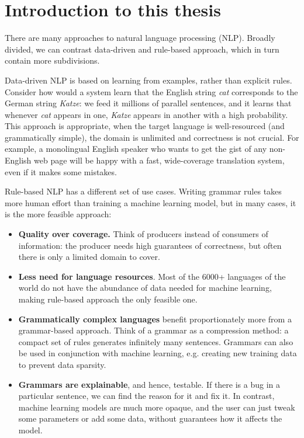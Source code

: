 \chapter{Introduction to this thesis}

There are many approaches to natural language processing (NLP).
Broadly divided, we can contrast data-driven and rule-based approach,
which in turn contain more subdivisions.

Data-driven NLP is based on learning from examples, rather than
explicit rules. Consider how would a system learn that the English
string \emph{cat} corresponds to the German string \emph{Katze}: we
feed it millions of parallel sentences, and it learns that whenever
\emph{cat} appears in one, \emph{Katze} appears in another with a high
probability. This approach is appropriate, when the target language is
well-resourced (and grammatically simple), the domain is unlimited and
correctness is not crucial. For example, a monolingual English speaker
who wants to get the gist of any non-English web page will be happy
with a fast, wide-coverage translation system, even if it makes some
mistakes.

Rule-based NLP has a different set of use cases. Writing grammar rules
takes more human effort than training a machine learning model, but in
many cases, it is the more feasible approach:
\begin{itemize}
  \setlength\itemsep{0.0em} \item \textbf{Quality over coverage.}
  Think of producers instead of consumers of information: the producer
  needs high guarantees of correctness, but often there is only a
  limited domain to cover. %

\item \textbf{Less need for language resources}. Most of the 6000+
  languages of the world do not have the abundance of data needed for
  machine learning, making rule-based approach the only feasible one.

\item \textbf{Grammatically complex languages} benefit proportionately
  more from a grammar-based approach. Think of a grammar as a
  compression method: a compact set of rules generates infinitely many
  sentences. Grammars can also be used in conjunction with machine
  learning, e.g. creating new training data to prevent data sparsity.

\item \textbf{Grammars are explainable}, and hence, testable. If there
  is a bug in a particular sentence, we can find the reason for it and
  fix it. In contrast, machine learning models are much more opaque,
  and the user can just tweak some parameters or add some data, without guarantees how
  it affects the model.
\end{itemize}

